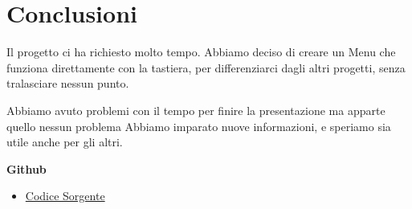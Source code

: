 \documentclass[a4paper,12pt]{article}
\begin{document}
\newpage

\section{Conclusioni}
\begin{center}
    Il progetto ci ha richiesto molto tempo. 
    Abbiamo deciso di creare un Menu che funziona direttamente con la tastiera, per differenziarci dagli altri progetti, senza tralasciare nessun punto.

    Abbiamo avuto problemi con il tempo per finire la presentazione ma apparte quello nessun problema
    Abbiamo imparato nuove informazioni, e speriamo sia utile anche per gli altri. 
\end{center}

\huge{\textbf{Github}}
\normalsize{\begin{itemize}
    \item \textcolor{blue}{\href{https://github.com/ItzAbu/Biblioteca_Gruppo4}{Codice Sorgente}}
\end{itemize}}
\end{document}
